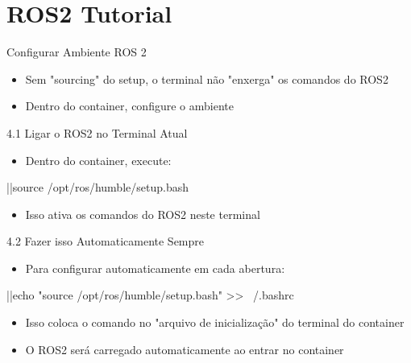 \section{ROS2 Tutorial}

\begin{frame}{Configurar Ambiente ROS 2}
\begin{itemize}
  \item Sem "sourcing" do setup, o terminal não "enxerga" os comandos do ROS2
  \item Dentro do container, configure o ambiente
\end{itemize}
\end{frame}

\begin{frame}[fragile]{4.1 Ligar o ROS2 no Terminal Atual}
\begin{itemize}
  \item Dentro do container, execute:
\end{itemize}

\begin{bashprompt}
|\nocopy{\textdollar\ }|source /opt/ros/humble/setup.bash
\end{bashprompt}

\begin{itemize}
  \item Isso ativa os comandos do ROS2 neste terminal
\end{itemize}
\end{frame}

\begin{frame}[fragile]{4.2 Fazer isso Automaticamente Sempre}
\begin{itemize}
  \item Para configurar automaticamente em cada abertura:
\end{itemize}

\begin{bashprompt}
|\nocopy{\textdollar\ }|echo "source /opt/ros/humble/setup.bash" >> ~/.bashrc
\end{bashprompt}

\begin{itemize}
  \item Isso coloca o comando no "arquivo de inicialização" do terminal do container
  \item O ROS2 será carregado automaticamente ao entrar no container
\end{itemize}
\end{frame}

